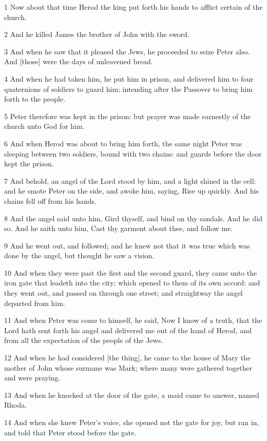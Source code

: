 \par 1 Now about that time Herod the king put forth his hands to afflict certain of the church.
\par 2 And he killed James the brother of John with the sword.
\par 3 And when he saw that it pleased the Jews, he proceeded to seize Peter also. And [those] were the days of unleavened bread.
\par 4 And when he had taken him, he put him in prison, and delivered him to four quaternions of soldiers to guard him; intending after the Passover to bring him forth to the people.
\par 5 Peter therefore was kept in the prison: but prayer was made earnestly of the church unto God for him.
\par 6 And when Herod was about to bring him forth, the same night Peter was sleeping between two soldiers, bound with two chains: and guards before the door kept the prison.
\par 7 And behold, an angel of the Lord stood by him, and a light shined in the cell: and he smote Peter on the side, and awoke him, saying, Rise up quickly. And his chains fell off from his hands.
\par 8 And the angel said unto him, Gird thyself, and bind on thy sandals. And he did so. And he saith unto him, Cast thy garment about thee, and follow me.
\par 9 And he went out, and followed; and he knew not that it was true which was done by the angel, but thought he saw a vision.
\par 10 And when they were past the first and the second guard, they came unto the iron gate that leadeth into the city; which opened to them of its own accord: and they went out, and passed on through one street; and straightway the angel departed from him.
\par 11 And when Peter was come to himself, he said, Now I know of a truth, that the Lord hath sent forth his angel and delivered me out of the hand of Herod, and from all the expectation of the people of the Jews.
\par 12 And when he had considered [the thing], he came to the house of Mary the mother of John whose surname was Mark; where many were gathered together and were praying.
\par 13 And when he knocked at the door of the gate, a maid came to answer, named Rhoda.
\par 14 And when she knew Peter's voice, she opened not the gate for joy, but ran in, and told that Peter stood before the gate.
